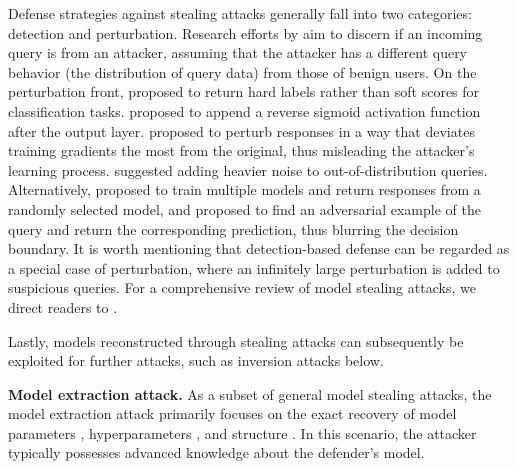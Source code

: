     Defense strategies against stealing attacks generally fall into two categories: detection and perturbation. 
    Research efforts by \citep{juuti2019prada, yu2020cloudleak, kariyappa2020defending, zhang2021seat, liu2022seinspect, dziedzic2022increasing} aim to discern if an incoming query is from an attacker, assuming that the attacker has a different query behavior (the distribution of query data) from those of benign users. 
    On the perturbation front, \citet{tramer2016stealing} proposed to return hard labels rather than soft scores for classification tasks. \citet{lee2019defending} proposed to append a reverse sigmoid activation function after the output layer. \citet{orekondy2019prediction} proposed to perturb responses in a way that deviates training gradients the most from the original, thus misleading the attacker's learning process. \citet{kariyappa2020defending} suggested adding heavier noise to out-of-distribution queries. Alternatively, \citet{kariyappa2020protecting} proposed to train multiple models and return responses from a randomly selected model, and \citet{zhang2023apmsa} proposed to find an adversarial example of the query and return the corresponding prediction, thus blurring the decision boundary. 
    It is worth mentioning that detection-based defense can be regarded as a special case of perturbation, where an infinitely large perturbation is added to suspicious queries. For a comprehensive review of model stealing attacks, we direct readers to \citet{oliynyk2023know}.

    Lastly, models reconstructed through stealing attacks can subsequently be exploited for further attacks, such as inversion attacks below.

    \textbf{Model extraction attack.} As a subset of general model stealing attacks, the model extraction attack primarily focuses on the exact recovery of model parameters \citep{tramer2016stealing,milli2019model,jagielski2020high}, hyperparameters \citep{wang2018stealing}, and structure \citep{rolnick2020reverse,duddu2018stealing}.  In this scenario, the attacker typically possesses advanced knowledge about the defender's model.


